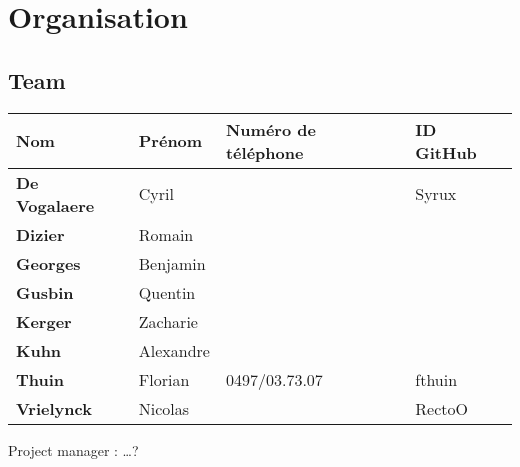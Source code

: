 \section{Organisation}

\subsection{Team}

\begin{tabular}{|l|l|l|l|}
    \hline
    Nom & Prénom & Numéro de téléphone & ID GitHub \\
    \hline
    \hline
    \textbf{De Vogalaere} & Cyril & & Syrux\\
    \hline
    \textbf{Dizier} & Romain & & \\
    \hline
    \textbf{Georges} & Benjamin & & \\
    \hline
    \textbf{Gusbin} & Quentin & & \\
    \hline
    \textbf{Kerger} & Zacharie & & \\
    \hline
    \textbf{Kuhn} & Alexandre & & \\
    \hline
    \textbf{Thuin} & Florian & 0497/03.73.07 & fthuin\\
    \hline
    \textbf{Vrielynck} & Nicolas & & RectoO \\
    \hline
\end{tabular}

Project manager : \ldots ?

